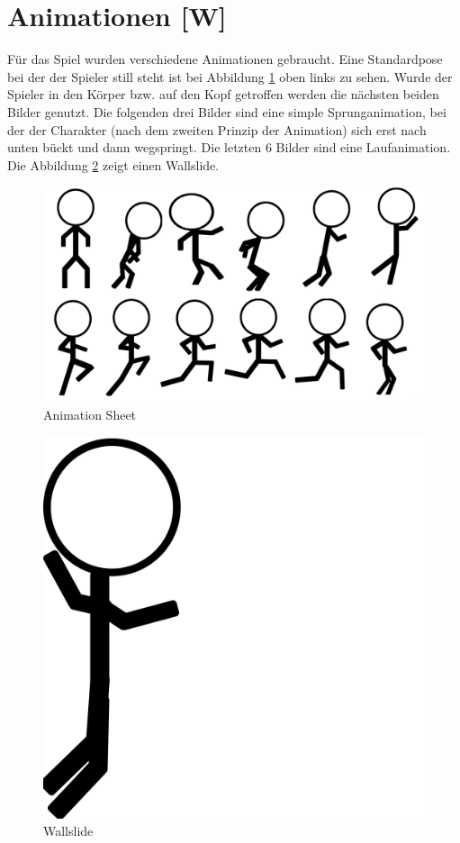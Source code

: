 \section{Animationen [W]} \label{animations}
Für das Spiel wurden verschiedene Animationen gebraucht. Eine Standardpose bei der der Spieler still steht ist bei Abbildung \ref*{AnimationSheet} oben links zu sehen.
Wurde der Spieler in den Körper bzw. auf den Kopf getroffen werden die nächsten beiden Bilder genutzt. Die folgenden drei Bilder sind eine simple Sprunganimation, bei der der Charakter (nach dem zweiten Prinzip der Animation) sich erst nach unten bückt und dann wegspringt.
Die letzten 6 Bilder sind eine Laufanimation. Die Abbildung \ref{Wallslide} zeigt einen Wallslide.
\begin{figure}[H]
    \centering
    \includegraphics[scale=0.3]{pics/AnimationSheet.png}
    \caption{Animation Sheet}
    \label{AnimationSheet}
\end{figure}

\begin{figure}[H]
    \centering
    \includegraphics[scale=0.1]{pics/ScribblePNG/Wallslide.png}
    \caption{Wallslide}
    \label{Wallslide}
\end{figure}


